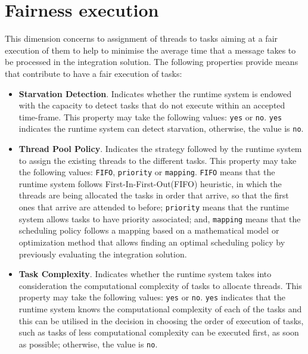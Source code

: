 \section{Fairness execution}
\label{sec:fairness}

This dimension concerns to assignment of threads to tasks aiming at a fair execution of them to help to minimise the average time that a message takes to be processed in the integration solution. The following properties provide means that contribute to have a fair execution of tasks:
\begin{itemize}
%	
\item \textbf{Starvation Detection}. Indicates whether the runtime system is endowed with the capacity to detect tasks that do not execute within an accepted time-frame. This property may take the following values: \texttt{yes} or \texttt{no}. \texttt{yes} indicates the runtime system can detect starvation, otherwise, the value is \texttt{no}. 
%	
\item \textbf{Thread Pool Policy}. Indicates the strategy followed by the runtime system to assign the existing threads to the different tasks. This property may take the following values: \texttt{FIFO}, \texttt{priority} or \texttt{mapping}. \texttt{FIFO} means that the runtime system follows First-In-First-Out(FIFO) heuristic, in which the threads are being allocated the tasks in order that arrive, so that the first ones that arrive are attended to before; \texttt{priority} means that the runtime system allows tasks to have priority associated; and, \texttt{mapping} means that the scheduling policy follows a mapping based on a mathematical model or optimization method that allows finding an optimal scheduling policy by previously evaluating the integration solution.
%	
\item \textbf{Task Complexity}. Indicates whether the runtime system takes into consideration the computational complexity of tasks to allocate threads. This property may take the following values: \texttt{yes} or \texttt{no}. \texttt{yes} indicates that the runtime system knows the computational complexity of each of the tasks and this can be utilised in the decision in choosing the order of execution of tasks, such as tasks of less computational complexity can be executed first, as soon as possible; otherwise, the value is \texttt{no}.

\end{itemize}
